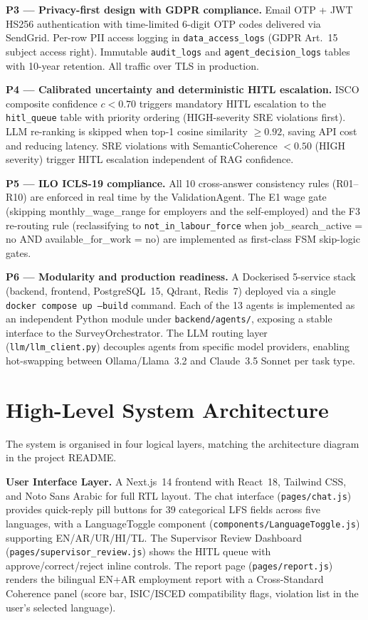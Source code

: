 \textbf{P3 --- Privacy-first design with GDPR compliance.}
Email OTP + JWT HS256 authentication with time-limited 6-digit OTP codes
delivered via SendGrid.
Per-row PII access logging in \texttt{data\_access\_logs} (GDPR Art.~15
subject access right).
Immutable \texttt{audit\_logs} and \texttt{agent\_decision\_logs} tables with
10-year retention.
All traffic over TLS in production.

\textbf{P4 --- Calibrated uncertainty and deterministic HITL escalation.}
ISCO composite confidence $c < 0.70$ triggers mandatory HITL escalation to the
\texttt{hitl\_queue} table with priority ordering (HIGH-severity SRE violations
first).
LLM re-ranking is skipped when top-1 cosine similarity $\geq 0.92$, saving API
cost and reducing latency.
SRE violations with SemanticCoherence $< 0.50$ (HIGH severity) trigger HITL
escalation independent of RAG confidence.

\textbf{P5 --- ILO ICLS-19 compliance.}
All 10 cross-answer consistency rules (R01--R10) are enforced in real time by
the ValidationAgent.
The E1 wage gate (skipping monthly\_wage\_range for employers and the
self-employed) and the F3 re-routing rule (reclassifying to
\texttt{not\_in\_labour\_force} when job\_search\_active = no AND
available\_for\_work = no) are implemented as first-class FSM skip-logic gates.

\textbf{P6 --- Modularity and production readiness.}
A Dockerised 5-service stack (backend, frontend, PostgreSQL~15, Qdrant,
Redis~7) deployed via a single \texttt{docker compose up --build} command.
Each of the 13 agents is implemented as an independent Python module under
\texttt{backend/agents/}, exposing a stable interface to the SurveyOrchestrator.
The LLM routing layer (\texttt{llm/llm\_client.py}) decouples agents from
specific model providers, enabling hot-swapping between Ollama/Llama~3.2
and Claude~3.5 Sonnet per task type.

\section{High-Level System Architecture}
\label{sec:arch-overview}

The system is organised in four logical layers, matching the architecture
diagram in the project \mbox{README}.

\textbf{User Interface Layer.}
A Next.js~14 frontend with React~18, Tailwind CSS, and Noto Sans Arabic for
full RTL layout.
The chat interface (\texttt{pages/chat.js}) provides quick-reply pill buttons
for 39 categorical LFS fields across five languages, with a LanguageToggle
component (\texttt{components/\-LanguageToggle.\-js}) supporting EN/AR/UR/HI/TL.
The Supervisor Review Dashboard (\texttt{pages/\-supervisor\_\-review.\-js}) shows
the HITL queue with approve/correct/reject inline controls.
The report page (\texttt{pages/report.js}) renders the bilingual EN+AR
employment report with a Cross-Standard Coherence panel (score bar, ISIC/ISCED
compatibility flags, violation list in the user's selected language).

